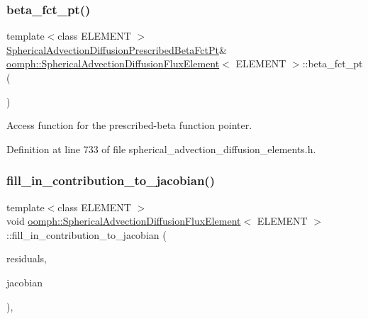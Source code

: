 \subsubsection{\texorpdfstring{beta\+\_\+fct\+\_\+pt()}{beta\_fct\_pt()}}
{\footnotesize\ttfamily template$<$class E\+L\+E\+M\+E\+NT $>$ \\
\hyperlink{classoomph_1_1SphericalAdvectionDiffusionFluxElement_a1fe86f85817dd5621ab510d37b3a8ce8}{Spherical\+Advection\+Diffusion\+Prescribed\+Beta\+Fct\+Pt}\& \hyperlink{classoomph_1_1SphericalAdvectionDiffusionFluxElement}{oomph\+::\+Spherical\+Advection\+Diffusion\+Flux\+Element}$<$ E\+L\+E\+M\+E\+NT $>$\+::beta\+\_\+fct\+\_\+pt (\begin{DoxyParamCaption}{ }\end{DoxyParamCaption})\hspace{0.3cm}{\ttfamily [inline]}}



Access function for the prescribed-\/beta function pointer. 



Definition at line 733 of file spherical\+\_\+advection\+\_\+diffusion\+\_\+elements.\+h.

\mbox{\label{classoomph_1_1SphericalAdvectionDiffusionFluxElement_a3863a02374ac70bacd47face3285d469}} 
\subsubsection{\texorpdfstring{fill\+\_\+in\+\_\+contribution\+\_\+to\+\_\+jacobian()}{fill\_in\_contribution\_to\_jacobian()}}
{\footnotesize\ttfamily template$<$class E\+L\+E\+M\+E\+NT $>$ \\
void \hyperlink{classoomph_1_1SphericalAdvectionDiffusionFluxElement}{oomph\+::\+Spherical\+Advection\+Diffusion\+Flux\+Element}$<$ E\+L\+E\+M\+E\+NT $>$\+::fill\+\_\+in\+\_\+contribution\+\_\+to\+\_\+jacobian (\begin{DoxyParamCaption}\item[{\hyperlink{classoomph_1_1Vector}{Vector}$<$ double $>$ \&}]{residuals,  }\item[{\hyperlink{classoomph_1_1DenseMatrix}{Dense\+Matrix}$<$ double $>$ \&}]{jacobian }\end{DoxyParamCaption})\hspace{0.3cm}{\ttfamily [inline]}, {\ttfamily [virtual]}}



